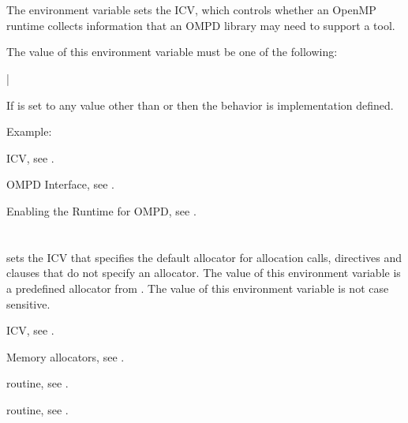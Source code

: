 \section{}
\label{sec:OMP_DEBUG}

The  environment variable sets the  ICV, 
which controls whether an OpenMP runtime collects information that an 
OMPD library may need to support a tool.

The value of this environment variable must be one of the following:

{|}

If  is set to any value other than 
or  then the behavior is implementation defined.

Example:
\begin{ompEnv}
\end{ompEnv}

\begin{crossrefs}
\item {} ICV,
see .

\item OMPD Interface, see .

\item Enabling the Runtime for OMPD, see .
\end{crossrefs}



\section{}
\label{sec:OMP_ALLOCATOR}

 sets the  ICV that specifies 
the default allocator for allocation calls, directives and clauses that 
do not specify an allocator. The value of this environment variable is a 
predefined allocator from . The value 
of this environment variable is not case sensitive.

\begin{crossrefs}
\item {} ICV, see .

\item Memory allocators, see .

\item {} routine, 
see .

\item {} routine, 
see .
\end{crossrefs}
